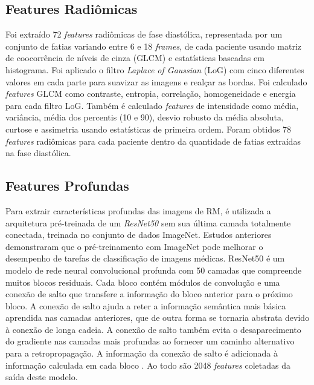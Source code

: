 \subsection{Features Radiômicas}
\label{subsec:cap4_features_radiomicas}

Foi extraído 72 \textit{features} radiômicas de fase diastólica, representada por um conjunto de fatias variando entre 6 e 18 \textit{frames}, de cada paciente usando matriz de coocorrência de níveis de cinza (GLCM) e estatísticas baseadas em histograma. Foi aplicado o filtro \textit{Laplace of Gaussian} (LoG) com cinco diferentes valores em cada parte para suavizar as imagens e realçar as bordas. Foi calculado \textit{features} GLCM como contraste, entropia, correlação, homogeneidade e energia para cada filtro LoG. Também é calculado \textit{features} de intensidade como média, variância, média dos percentis (10 e 90), desvio robusto da média absoluta, curtose e assimetria usando estatísticas de primeira ordem. Foram obtidos 78 \textit{features} radiômicas para cada paciente dentro da quantidade de fatias extraídas na fase diastólica.

\subsection{Features Profundas}
\label{subsec:cap4_features_profundas}
 
Para extrair características profundas das imagens de RM, é utilizada a arquitetura pré-treinada de um \textit{ResNet50} sem sua última camada totalmente conectada, treinada no conjunto de dados ImageNet. Estudos anteriores demonstraram que o pré-treinamento com ImageNet pode melhorar o desempenho de tarefas de classificação de imagens médicas. ResNet50 é um modelo de rede neural convolucional profunda com 50 camadas que compreende muitos blocos residuais. Cada bloco contém módulos de convolução e uma conexão de salto que transfere a informação do bloco anterior para o próximo bloco. A conexão de salto ajuda a reter a informação semântica mais básica aprendida nas camadas anteriores, que de outra forma se tornaria abstrata devido à conexão de longa cadeia. A conexão de salto também evita o desaparecimento do gradiente nas camadas mais profundas ao fornecer um caminho alternativo para a retropropagação. A informação da conexão de salto é adicionada à informação calculada em cada bloco \cite{aiSelfAttentionBasedFusion2023}. Ao todo são 2048 \textit{features} coletadas da saída deste modelo.

